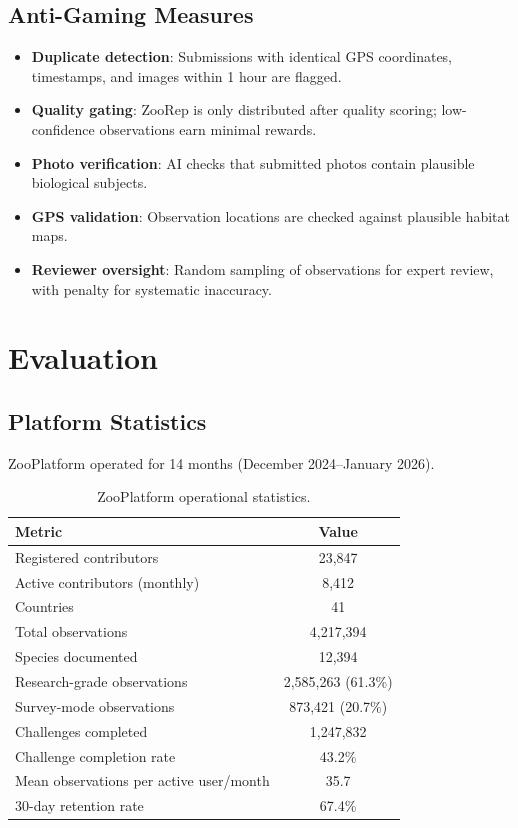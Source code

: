 \documentclass[11pt,a4paper]{article}
\begin{document}
\subsection{Anti-Gaming Measures}

\begin{itemize}
  \item \textbf{Duplicate detection}: Submissions with identical GPS
    coordinates, timestamps, and images within 1 hour are flagged.
  \item \textbf{Quality gating}: ZooRep is only distributed after
    quality scoring; low-confidence observations earn minimal rewards.
  \item \textbf{Photo verification}: AI checks that submitted photos
    contain plausible biological subjects.
  \item \textbf{GPS validation}: Observation locations are checked
    against plausible habitat maps.
  \item \textbf{Reviewer oversight}: Random sampling of observations
    for expert review, with penalty for systematic inaccuracy.
\end{itemize}


\section{Evaluation}
\label{sec:evaluation}

\subsection{Platform Statistics}

ZooPlatform operated for 14 months (December 2024--January 2026).

\begin{table}[H]
\centering
\caption{ZooPlatform operational statistics.}
\label{tab:stats}
\begin{tabular}{lc}
\toprule
\textbf{Metric} & \textbf{Value} \\
\midrule
Registered contributors & 23{,}847 \\
Active contributors (monthly) & 8{,}412 \\
Countries & 41 \\
Total observations & 4{,}217{,}394 \\
Species documented & 12{,}394 \\
Research-grade observations & 2{,}585{,}263 (61.3\%) \\
Survey-mode observations & 873{,}421 (20.7\%) \\
Challenges completed & 1{,}247{,}832 \\
Challenge completion rate & 43.2\% \\
Mean observations per active user/month & 35.7 \\
30-day retention rate & 67.4\% \\
\bottomrule
\end{tabular}
\end{table}
\end{document}
